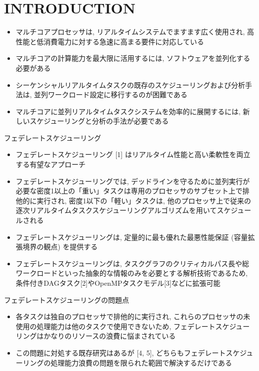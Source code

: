 
\section{INTRODUCTION}
\label{sec: introduction}

\begin{frame}{}
    \begin{itemize}
        \item マルチコアプロセッサは, リアルタイムシステムでますます広く使用され, 高性能と低消費電力に対する急速に高まる要件に対応している
        \item マルチコアの計算能力を最大限に活用するには, ソフトウェアを並列化する必要がある
        \item シーケンシャルリアルタイムタスクの既存のスケジューリングおよび分析手法は, 並列ワークロード設定に移行するのが困難である
        \item マルチコアに並列リアルタイムタスクシステムを効率的に展開するには, 新しいスケジューリングと分析の手法が必要である
    \end{itemize}
\end{frame}

\begin{frame}{フェデレートスケジューリング}
    \begin{itemize}
        \item フェデレートスケジューリング [1] はリアルタイム性能と高い柔軟性を両立する有望なアプローチ
        \item フェデレートスケジューリングでは, デッドラインを守るために並列実行が必要な密度1以上の「重い」タスクは専用のプロセッサのサブセット上で排他的に実行され, 密度1以下の「軽い」タスクは, 他のプロセッサ上で従来の逐次リアルタイムタスクスケジューリングアルゴリズムを用いてスケジュールされる
        \item フェデレートスケジューリングは, 定量的に最も優れた最悪性能保証 (容量拡張境界の観点) を提供する
        \item フェデレートスケジューリングは, タスクグラフのクリティカルパス長や総ワークロードといった抽象的な情報のみを必要とする解析技術であるため, 条件付きDAGタスク[2]やOpenMPタスクモデル[3]などに拡張可能
    \end{itemize}
\end{frame}

\begin{frame}{フェデレートスケジューリングの問題点}
    \begin{itemize}
        \item 各タスクは独自のプロセッサで排他的に実行され, これらのプロセッサの未使用の処理能力は他のタスクで使用できないため, フェデレートスケジューリングはかなりのリソースの浪費に悩まされている
        \item この問題に対処する既存研究はあるが [4, 5], どちらもフェデレートスケジューリングの処理能力浪費の問題を限られた範囲で解決するだけである
    \end{itemize}
\end{frame}

